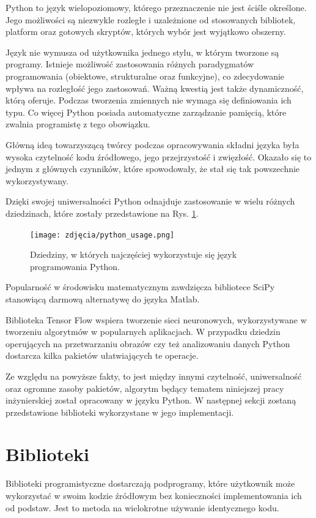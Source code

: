 Python to język wielopoziomowy, którego przeznaczenie nie jest ściśle określone. Jego możliwości są niezwykle rozległe i uzależnione od stosowanych bibliotek, platform oraz gotowych skryptów, których wybór jest wyjątkowo obszerny. 

Język nie wymusza od użytkownika jednego stylu, w którym tworzone są programy. Istnieje możliwość zastosowania różnych paradygmatów programowania (obiektowe, strukturalne oraz funkcyjne), co zdecydowanie wpływa na rozległość jego zastosowań. Ważną kwestią jest także dynamiczność, którą oferuje. Podczas tworzenia zmiennych nie wymaga się definiowania ich typu. Co więcej Python posiada automatyczne zarządzanie pamięcią, które zwalnia programistę z tego obowiązku. 

Główną ideą towarzyszącą twórcy podczas opracowywania składni języka była wysoka czytelność kodu źródłowego, jego przejrzystość i zwięzłość. Okazało się to jednym z głównych czynników, które spowodowały, że stał się tak powszechnie wykorzystywany.

Dzięki swojej uniwersalności Python odnajduje zastosowanie w wielu różnych dziedzinach, które zostały przedstawione na Rys. \ref{fig:pythonUsage}. 

\begin{figure}[h]
	\centering
	\texttt{[image: zdjęcia/python\_usage.png]}
	\caption{Dziedziny, w których najczęściej wykorzystuje się język programowania Python.} 
	\label{fig:pythonUsage}
\end{figure}

Popularność w środowisku matematycznym zawdzięcza bibliotece SciPy stanowiącą darmową alternatywę do języka Matlab. 

Biblioteka Tensor Flow wspiera tworzenie sieci neuronowych, wykorzystywane w tworzeniu algorytmów w popularnych aplikacjach. \cite{PythonApps} W przypadku dziedzin operujących na przetwarzaniu obrazów czy też analizowaniu danych Python dostarcza kilka pakietów ułatwiających te operacje.

Ze względu na powyższe fakty, to jest między innymi czytelność, uniwersalność oraz ogromne zasoby pakietów, algorytm będący tematem niniejszej pracy inżynierskiej został opracowany w języku Python. W następnej sekcji zostaną przedstawione biblioteki wykorzystane w jego implementacji.

\section{Biblioteki}
Biblioteki programistyczne dostarczają podprogramy, które użytkownik może wykorzystać w swoim kodzie źródłowym bez konieczności implementowania ich od podstaw. Jest to metoda na wielokrotne używanie identycznego kodu.

